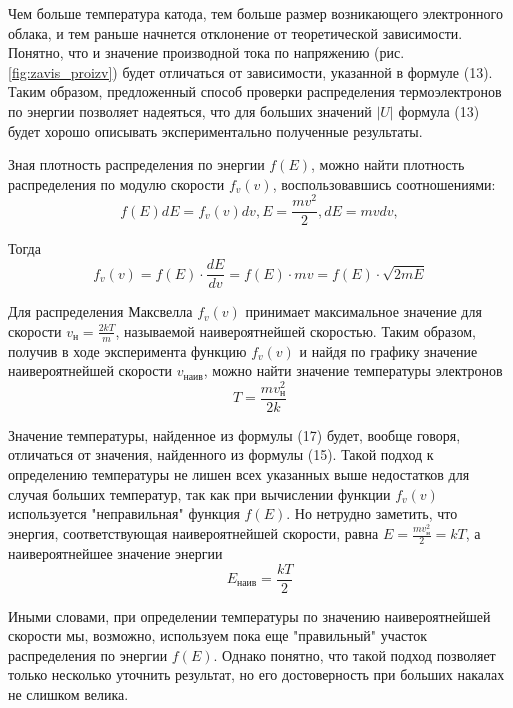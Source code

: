Чем больше температура катода, тем больше размер возникающего
электронного облака, и тем раньше начнется отклонение от теоретической
зависимости. Понятно, что и значение производной тока по напряжению (рис.\ref{fig:zavis_proizv})
будет отличаться от зависимости, указанной в формуле (13). Таким образом,
предложенный способ проверки распределения термоэлектронов по энергии
позволяет надеяться, что для больших значений $|U|$ формула (13) будет хорошо
описывать экспериментально полученные результаты. 
\par
Зная плотность распределения по энергии $f(E)$, можно найти плотность
распределения по модулю скорости $f_{v}(v)$, воспользовавшись соотношениями:
\[f(E)dE = f_{v}(v)dv, E = \frac{mv^2}{2}, dE = mvdv,\]
\par 
Тогда
\begin{equation}
    f_{v}(v) = f(E)\cdot \frac{dE}{dv} = f(E)\cdot mv = f(E) \cdot \sqrt{2mE}
\end{equation}
\par
Для распределения Максвелла $f_v(v)$ принимает максимальное значение для
скорости $v_{н}= \frac{2kT}{m}$, называемой наивероятнейшей скоростью. Таким образом,
получив в ходе эксперимента функцию $f_v(v)$ и найдя по графику значение
наивероятнейшей скорости $v_{\text{наив}}$, можно найти значение температуры электронов
\begin{equation}
    T = \frac{mv_{н}^{2}}{2k}
\end{equation}

\par
Значение температуры, найденное из формулы (17) будет, вообще говоря,
отличаться от значения, найденного из формулы (15). Такой подход к
определению температуры не лишен всех указанных выше недостатков для
случая больших температур, так как при вычислении функции $f_v(v)$ используется
"неправильная" функция $f(E)$. Но нетрудно заметить, что энергия,
соответствующая наивероятнейшей скорости, равна $E = \frac{mv_{н}^{2}}{2} = kT$, а наивероятнейшее значение энергии
\begin{equation}
    E_{\text{наив}} = \frac{kT}{2}
\end{equation}

\par Иными словами, при определении температуры по значению
наивероятнейшей скорости мы, возможно, используем пока еще "правильный"
участок распределения по энергии $f(E)$. Однако понятно, что такой подход
позволяет только несколько уточнить результат, но его достоверность при
больших накалах не слишком велика.

